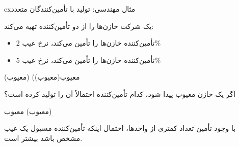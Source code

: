 \begin{PSbox}[unbreakable]{ex}{مثال مهندسی: تولید با تأمین‌کنندگان متعدد}

یک شرکت خازن‌ها را از دو تأمین‌کننده تهیه می‌کند:

\begin{itemize}
\tightlist
\item
  تأمین‌کننده  خازن‌ها را تأمین می‌کند، نرخ عیب 2\%
\item
  تأمین‌کننده  خازن‌ها را تأمین می‌کند، نرخ عیب 5\%
\end{itemize}

(معیوب) (معیوب\lr{\textbar{}}(معیوب\lr{\textbar{}})\PSbr{}\PSbr{}

اگر یک خازن معیوب پیدا شود، کدام تأمین‌کننده احتمالاً آن را تولید کرده است؟

معیوب) \PSbr{}معیوب) 

با وجود تأمین تعداد کمتری از واحدها، احتمال اینکه تأمین‌کننده  مسیول یک عیب مشخص باشد بیشتر است.

\end{PSbox}


